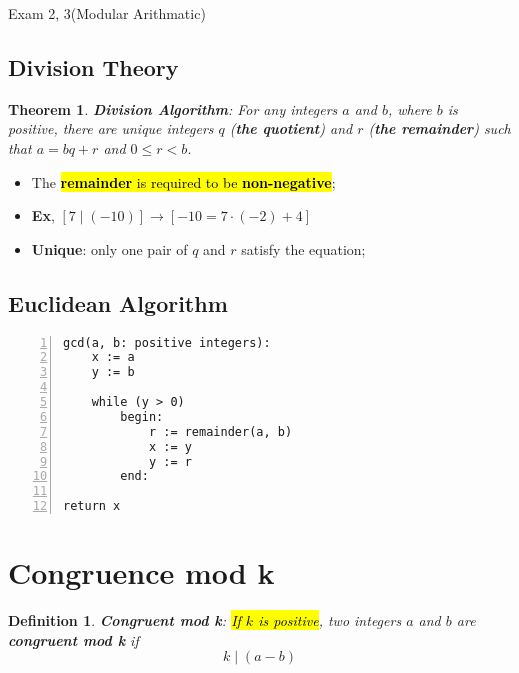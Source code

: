 \documentclass{note}
\newtheorem{definition}{Definition}
\newtheorem{theorem}{Theorem}
\begin{document}
\begin{note}{Exam 2, 3(Modular Arithmatic)}
        \subsection{Division Theory}

        \begin{theorem}
            \textbf{Division Algorithm}: For any integers $ a $ and $ b $, where $ b $ is positive, 
            there are unique integers $ q $ (\textbf{the quotient}) and $ r $ 
            (\textbf{the remainder}) such that $ a = bq + r $ and $ 0 \leq r < b $.
        \end{theorem}

        \begin{itemize}
            \item The \hl{\textbf{remainder} is required to be \textbf{non-negative}};
            \item \textbf{Ex}, $ \left[7 \mid \left(-10\right)\right] \to  \left[ -10 =7 \cdot \left( -2 \right) + 4 \right] $
            \item \textbf{Unique}: only one pair of $ q $ and $ r $ satisfy the equation;
        \end{itemize}

        \subsection{Euclidean Algorithm}

\begin{lstlisting}[caption=Code, numbers=left, frame=lines]
gcd(a, b: positive integers):
    x := a
    y := b

    while (y > 0)
        begin:
            r := remainder(a, b)
            x := y
            y := r
        end:

return x
\end{lstlisting}

        \section{Congruence mod k}

        \begin{definition}
            \textbf{Congruent mod k}: \hl{If $ k $ is positive}, two integers $ a $ and $ b $ are 
            \textbf{congruent mod k} if 
            \begin{equation} \label{eq: congruent mod k}
                k \mid \left( a - b \right)
            \end{equation}
        \end{definition}


\end{note}
\end{document}
